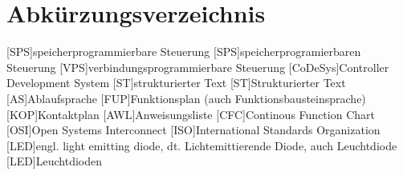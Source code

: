 \section*{Abkürzungsverzeichnis}
 \begin{acronym}[1234567890]
       [SPS]{speicherprogrammierbare Steuerung}
       [SPS]{speicherprogramierbaren Steuerung}
       [VPS]{verbindungsprogrammierbare Steuerung}
       [CoDeSys]{Controller Development System}
       [ST]{strukturierter Text}
       [ST]{Strukturierter Text}
       [AS]{Ablaufsprache}
       [FUP]{Funktionsplan (auch Funktionsbausteinsprache)}
       [KOP]{Kontaktplan}
       [AWL]{Anweisungsliste}
       [CFC]{Continous Function Chart}
       [OSI]{Open Systems Interconnect}
       [ISO]{International Standards Organization}
       [LED]{engl. light emitting diode, dt. Lichtemittierende Diode, auch Leuchtdiode}
       [LED]{Leuchtdioden}
       
\end{acronym}
